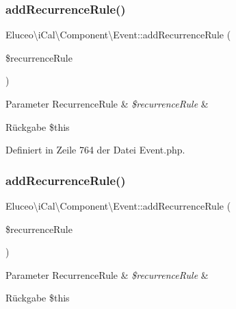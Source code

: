 \subsubsection{\texorpdfstring{add\+Recurrence\+Rule()}{addRecurrenceRule()}\hspace{0.1cm}{\footnotesize\ttfamily [1/3]}}
{\footnotesize\ttfamily Eluceo\textbackslash{}i\+Cal\textbackslash{}\+Component\textbackslash{}\+Event\+::add\+Recurrence\+Rule (\begin{DoxyParamCaption}\item[{\mbox{\hyperlink{class_eluceo_1_1i_cal_1_1_property_1_1_event_1_1_recurrence_rule}{Recurrence\+Rule}}}]{\$recurrence\+Rule }\end{DoxyParamCaption})}


\begin{DoxyParams}[1]{Parameter}
Recurrence\+Rule & {\em \$recurrence\+Rule} & \\
\hline
\end{DoxyParams}
\begin{DoxyReturn}{Rückgabe}
\$this 
\end{DoxyReturn}


Definiert in Zeile 764 der Datei Event.\+php.

\mbox{\label{class_eluceo_1_1i_cal_1_1_component_1_1_event_a204c48aab126855e3176ed4a796361be}} 
\subsubsection{\texorpdfstring{add\+Recurrence\+Rule()}{addRecurrenceRule()}\hspace{0.1cm}{\footnotesize\ttfamily [2/3]}}
{\footnotesize\ttfamily Eluceo\textbackslash{}i\+Cal\textbackslash{}\+Component\textbackslash{}\+Event\+::add\+Recurrence\+Rule (\begin{DoxyParamCaption}\item[{\mbox{\hyperlink{class_eluceo_1_1i_cal_1_1_property_1_1_event_1_1_recurrence_rule}{Recurrence\+Rule}}}]{\$recurrence\+Rule }\end{DoxyParamCaption})}


\begin{DoxyParams}[1]{Parameter}
Recurrence\+Rule & {\em \$recurrence\+Rule} & \\
\hline
\end{DoxyParams}
\begin{DoxyReturn}{Rückgabe}
\$this 
\end{DoxyReturn}


